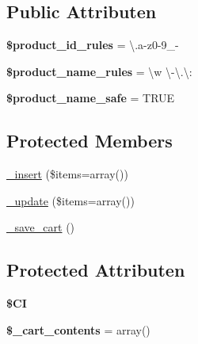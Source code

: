 \subsection*{Public Attributen}
\begin{DoxyCompactItemize}
\item 
\mbox{\label{class_c_i___cart_aef9fb0bb2a9ab37008d77ed80b7b122b}} 
{\bfseries \$product\+\_\+id\+\_\+rules} = \textquotesingle{}\textbackslash{}.a-\/z0-\/9\+\_\+-\/\textquotesingle{}
\item 
\mbox{\label{class_c_i___cart_afdc2e791be5e676e94580a0d9ed63ebf}} 
{\bfseries \$product\+\_\+name\+\_\+rules} = \textquotesingle{}\textbackslash{}w \textbackslash{}-\/\textbackslash{}.\textbackslash{}\+:\textquotesingle{}
\item 
\mbox{\label{class_c_i___cart_afefced563284b97869b3d35053857362}} 
{\bfseries \$product\+\_\+name\+\_\+safe} = T\+R\+UE
\end{DoxyCompactItemize}
\subsection*{Protected Members}
\begin{DoxyCompactItemize}
\item 
\mbox{\hyperlink{class_c_i___cart_a55d27979573b7d46bdf774f247c15b07}{\+\_\+insert}} (\$items=array())
\item 
\mbox{\hyperlink{class_c_i___cart_ac7b19afff2357d4b9e926ee2df1f3e65}{\+\_\+update}} (\$items=array())
\item 
\mbox{\hyperlink{class_c_i___cart_abaa559f3e9e7f8ad933f19165fb61083}{\+\_\+save\+\_\+cart}} ()
\end{DoxyCompactItemize}
\subsection*{Protected Attributen}
\begin{DoxyCompactItemize}
\item 
\mbox{\label{class_c_i___cart_ae0314d046ddf7fcfaec03222977427d3}} 
{\bfseries \$\+CI}
\item 
\mbox{\label{class_c_i___cart_a93aff4174af6004d8cc7a51bf0c59632}} 
{\bfseries \$\+\_\+cart\+\_\+contents} = array()
\end{DoxyCompactItemize}


